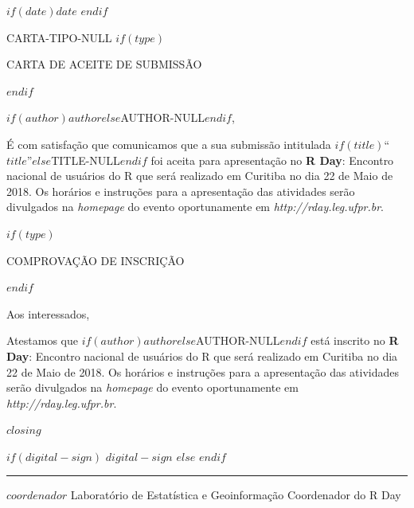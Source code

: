 \documentclass[a4paper, 11pt]{letter}
\date{}
\def\COMPLEMENTO{
  no \textbf{R Day}: Encontro nacional de usuários do R que será
  realizado em Curitiba no dia 22 de Maio de 2018.  Os horários e
  instruções para a apresentação das atividades serão divulgados na
  \textit{homepage} do evento oportunamente em
  \textit{http://rday.leg.ufpr.br}.
}
\begin{document}
\begin{letter}{}

  $if(date)$\hfill $date$ \vspace{1em}$endif$


  \ifx\CARTATIPO\undefined %
  CARTA-TIPO-NULL
  \else
  \if{}
  $if(type)${\begin{center} \uppercase{Carta de Aceite de Submissão} \end{center}}$endif$

  \opening{$if(author)$$author$$else$AUTHOR-NULL$endif$,}

  \vspace{3em}

  \hspace{1.5cm}
  É com satisfação que comunicamos que a sua submissão intitulada
  $if(title)$``\textbf{$title$}''$else$TITLE-NULL$endif$
  foi aceita para apresentação \COMPLEMENTO

  \else

  $if(type)${\begin{center} \uppercase{Comprovação de Inscrição} \end{center}}$endif$

  \opening{Aos interessados,}

  \vspace{3em}

  \hspace{1.5cm}
  Atestamos que
  $if(author)$\textbf{$author$}$else$AUTHOR-NULL$endif$
  está inscrito \COMPLEMENTO

  \fi
  \fi

  \vspace{3em}
  \hspace{1.5cm} $closing$
  \vspace{2em}

  \pagestyle{fancy}
  \thispagestyle{fancy}

  \hfill
  \begin{minipage}{0.5\linewidth}

    $if(digital-sign)$
    $digital-sign$
    $else$
    \vspace{3em}
    $endif$

    \begin{flushright}
      \rule{\textwidth}{0.5pt}

      $coordenador$\newline
      Laboratório de Estatística e Geoinformação\newline
      Coordenador do R Day\newline
    \end{flushright}

  \end{minipage}

  \vfill

\end{letter}
\end{document}
